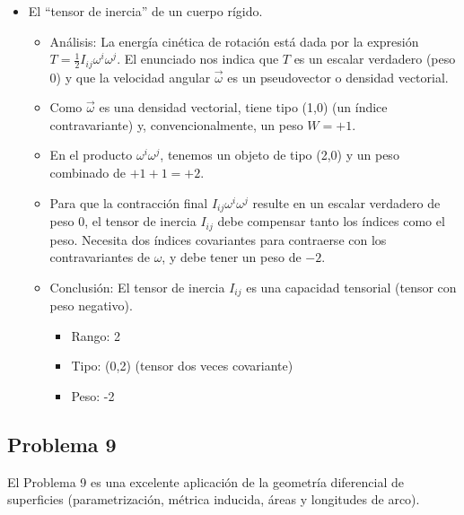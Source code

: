 \documentclass[11pt,spanish]{article}
\begin{document}
\begin{itemize}
\item El ``tensor de inercia'' de un cuerpo rígido.
\begin{itemize}
\item Análisis: La energía cinética de rotación está dada por la expresión $T = \frac{1}{2} I_{ij} \omega^i \omega^j$. El enunciado nos indica que $T$ es un escalar verdadero (peso 0) y que la velocidad angular $\vec{\omega}$ es un pseudovector o densidad vectorial. 
\item Como $\vec{\omega}$ es una densidad vectorial, tiene tipo (1,0) (un índice contravariante) y, convencionalmente, un peso $W = +1$.
\item En el producto $\omega^i \omega^j$, tenemos un objeto de tipo (2,0) y un peso combinado de $+1 + 1 = +2$.
\item Para que la contracción final $I_{ij} \omega^i \omega^j$ resulte en un escalar verdadero de peso 0, el tensor de inercia $I_{ij}$ debe compensar tanto los índices como el peso. Necesita dos índices covariantes para contraerse con los contravariantes de $\omega$, y debe tener un peso de $-2$.
\item Conclusión: El tensor de inercia $I_{ij}$ es una capacidad tensorial (tensor con peso negativo).
\begin{itemize}
\item Rango: 2
\item Tipo: (0,2) (tensor dos veces covariante)
\item Peso: -2
\end{itemize}
\end{itemize}
\end{itemize}

\subsection*{Problema 9}

El Problema 9 es una excelente aplicación de la geometría diferencial de superficies (parametrización, métrica inducida, áreas y longitudes de arco). 
\end{document}
